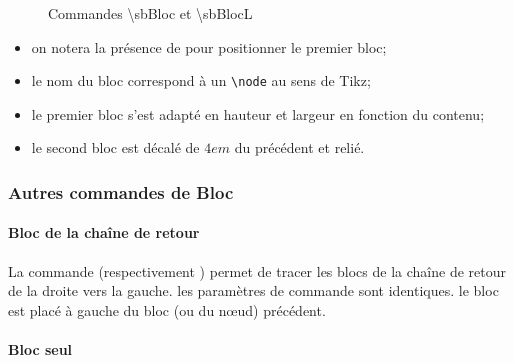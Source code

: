 \documentclass[a4paper,11pt]{article}                      %
\newcommand{\noeud}{n\oe ud}
\begin{document}
\begin{figure}[!htb]
\centering
\begin{tikzexample}[title=  ,   righthand width=0.45\textwidth,]
\end{tikzexample}

\begin{tikzexample}[title=  ,   righthand width=0.45\textwidth,]
\end{tikzexample}
\caption{Commandes 
\textbackslash sbBloc   et  {\textbackslash sbBlocL} }
\label{fig:commandebloc}
\end{figure}

\begin{itemize}
    	\item on notera la présence de \myverb{\sbentree} pour positionner le premier bloc;
	\item le nom du bloc correspond à un \verb+\node+  au sens de Tikz;
   	\item le premier bloc s'est adapté en hauteur et largeur en fonction du contenu;
    	\item le second bloc est décalé de $4em$ du précédent et relié.
\end{itemize}



\subsubsection{Autres commandes de Bloc}


\paragraph{Bloc de la chaîne de retour} 

La commande  (respectivement ) permet de tracer les blocs de la chaîne de retour de la droite vers la gauche. les paramètres de commande sont identiques. le bloc est placé à gauche du bloc (ou du \noeud) précédent.

\paragraph{Bloc seul}
\end{document}
